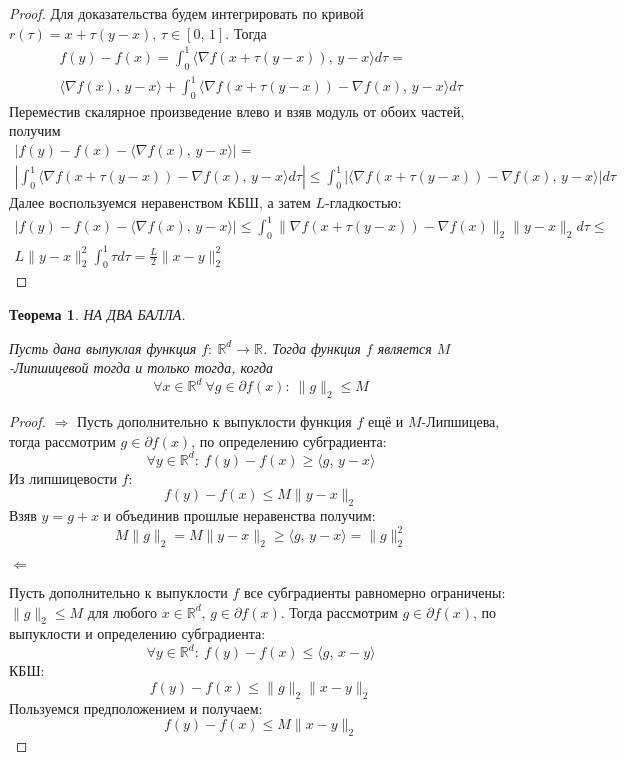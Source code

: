 \documentclass[a4paper,12pt]{article}
\renewcommand{\leq}{\ensuremath{\leqslant}}
\renewcommand{\geq}{\ensuremath{\geqslant}}
\theoremstyle{plain}
\newtheorem{theorem}{Теорема}[section]
\theoremstyle{definition}
\theoremstyle{remark}
\begin{document}
\begin{proof}
	Для доказательства будем интегрировать по кривой $r(\tau) = x + \tau(y - x),\, \tau \in [0,\,1]$. Тогда
	\begin{align*}
		f(y) - f(x) = \int_0^1 \langle\nabla f(x + \tau(y - x)),\, y - x\rangle d\tau = \\
		\langle \nabla f(x),\, y - x\rangle + \int_0^1 \langle\nabla f(x + \tau(y - x)) - \nabla f(x),\, y - x\rangle d\tau
	\end{align*}
	Переместив скалярное произведение влево и взяв модуль от обоих частей, получим
	\begin{align*}
		\vert f(y) - f(x) - \langle\nabla f(x),\, y - x\rangle\vert = \\
		\left\vert \int_0^1 \langle \nabla f(x + \tau (y - x)) - \nabla f(x),\, y - x\rangle d\tau\right\vert \leq \int_0^1 \vert\langle \nabla f(x + \tau (y - x)) - \nabla f(x),\, y - x\rangle\vert d\tau
	\end{align*}
	Далее воспользуемся неравенством КБШ, а затем $L$-гладкостью:
	\begin{align*}
		\vert f(y) - f(x) - \langle\nabla f(x) ,\, y - x\rangle\vert \leq \int_0^1 \| \nabla f(x + \tau (y - x)) - \nabla f(x)\|_2\| y - x\|_2 d\tau \leq \\
		L\|y - x\|_2^2 \int_0^1 \tau d\tau = \frac{L}{2}\|x - y\|_2^2
	\end{align*}
\end{proof}

\begin{theorem}
	НА ДВА БАЛЛА.

	Пусть дана выпуклая функция $f :\: \mathbb{R}^d \to \mathbb{R}$. Тогда функция $f$ является $M$-Липшицевой тогда и только тогда, когда
	\[
		\forall x \in \mathbb{R}^d \: \forall g \in \partial f(x) :\: \|g\|_2 \leq M
	\]
\end{theorem}

\begin{proof}
	$\Rightarrow$ Пусть дополнительно к выпуклости функция $f$ ещё и $M$-Липшицева, тогда рассмотрим $g \in \partial f(x)$, по определению субградиента:
	\[
		\forall y \in \mathbb{R}^d :\: f(y) - f(x) \geq \langle g,\, y -x\rangle
	\]
	Из липшицевости $f$:
	\[
		f(y) - f(x) \leq M\|y - x\|_2
	\]
	Взяв $y = g + x$ и объединив прошлые неравенства получим:
	\[
		M \|g\|_2 = M\|y - x\|_2 \geq \langle g,\, y -x \rangle = \|g\|_2^2
	\]

	$\Leftarrow$

	Пусть дополнительно к выпуклости $f$ все субградиенты равномерно ограничены: $\|g\|_2 \leq M$ для любого $x \in \mathbb{R}^d,\, g \in \partial f(x)$. Тогда рассмотрим $g \in \partial f(x)$, по выпуклости и определению субградиента:
	\[
		\forall y \in \mathbb{R}^d :\: f(y) - f(x) \leq \langle g,\, x - y\rangle
	\]
	КБШ:
	\[
		f(y) - f(x) \leq \|g\|_2\|x - y\|_2
	\]
	Пользуемся предположением и получаем:
	\[
		f(y) - f(x) \leq M\|x - y\|_2
	\]
\end{proof}
\end{document}
